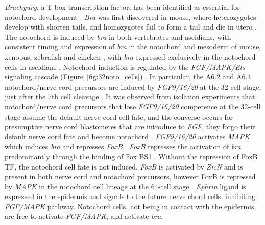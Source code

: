 \textit{Brachyury}, a T-box transcription factor, has been identified as essential for notochord development \cite{yasuo_conservation_1998}. \textit{Bra} was first discovered in mouse, where heterozygotes develop with shorten tails, and homozygotes fail to form a tail and die in utero \cite{herrmann_t_1994}. The notochord is induced by {\em bra} in both vertebrates and ascidians, with consistent timing and expression of \textit{bra} in the notochord and mesoderm of mouse, xenopus, zebrafish and chicken \cite{kavka_tales_1997}, with {\em bra} expressed exclusively in the notochord cells in ascidians \cite{yasuo_ascidian_1994}. Notochord induction is regulated by the \textit{FGF/MAPK/Ets} signaling cascade (Figure~\ref{fig:32noto_cells}) \cite{minokawa_binary_2001}. In particular, the A6.2 and A6.4 notochord/nerve cord precursors are induced by \textit{FGF9/16/20} at the 32-cell stage, just after the 7th cell cleavage \cite{satoh_ascidian_2001}. It was observed from isolation experiments that notochord/nerve cord precursors that lose \textit{FGF9/16/20} competence at the 32-cell stage assume the default nerve cord cell fate, and the converse occurs for presumptive nerve cord blastomeres that are introduce to \textit{FGF}, they forgo their default nerve cord fate and become notochord \cite{yasuo_conservation_1998,minokawa_binary_2001}. %
\textit{FGF9/16/20} activates \textit{MAPK} which induces \textit{bra} and represses \textit{FoxB} \cite{hashimoto_transcription_2011}. %
\textit{FoxB} represses the activation of \textit{bra} predominantly through the binding of Fox BS1%
. Without the repression of FoxB TF, the notochord cell fate is not induced. %
\textit{FoxB} is activated by \textit{ZicN} and is present in both nerve cord and notochord precursors, however FoxB is repressed by \textit{MAPK} in the notochord cell lineage at the 64-cell stage \cite{hashimoto_transcription_2011}. \textit{Ephrin} ligand is expressed in the epidermis and signals to the future nerve chord cells, inhibiting \textit{FGF/MAPK} pathway. Notochord cells, not being in contact with the epidermis, are free to activate \textit{FGF/MAPK}, and activate \textit{bra}.

